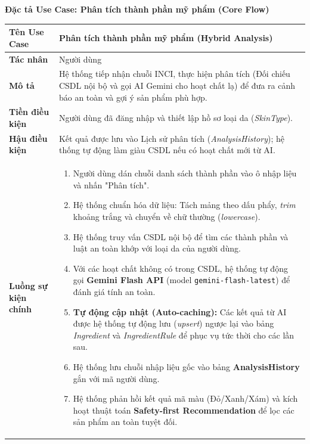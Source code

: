 \documentclass[12pt,a4paper]{article}
\begin{document}

\vspace{0.5cm}
\textbf{Đặc tả Use Case: Phân tích thành phần mỹ phẩm (Core Flow)}

\begin{center}
\renewcommand{\arraystretch}{1.4}
\begin{tabular}{|p{4cm}|p{10cm}|}
\hline
\rowcolor{blue!15}
\textbf{Tên Use Case} & \textbf{Phân tích thành phần mỹ phẩm (Hybrid Analysis)} \\ \hline
\textbf{Tác nhân} & Người dùng \\ \hline
\textbf{Mô tả} & Hệ thống tiếp nhận chuỗi INCI, thực hiện phân tích (Đối chiếu CSDL nội bộ và gọi AI Gemini cho hoạt chất lạ) để đưa ra cảnh báo an toàn và gợi ý sản phẩm phù hợp. \\ \hline
\textbf{Tiền điều kiện} & Người dùng đã đăng nhập và thiết lập hồ sơ loại da (\textit{SkinType}). \\ \hline
\textbf{Hậu điều kiện} & Kết quả được lưu vào Lịch sử phân tích (\textit{AnalysisHistory}); hệ thống tự động làm giàu CSDL nếu có hoạt chất mới từ AI. \\ \hline
\textbf{Luồng sự kiện chính} & 
\begin{enumerate}
    \item Người dùng dán chuỗi danh sách thành phần vào ô nhập liệu và nhấn "Phân tích".
    \item Hệ thống chuẩn hóa dữ liệu: Tách mảng theo dấu phẩy, \textit{trim} khoảng trắng và chuyển về chữ thường (\textit{lowercase}).
    \item Hệ thống truy vấn CSDL nội bộ để tìm các thành phần và luật an toàn khớp với loại da của người dùng.
    \item Với các hoạt chất không có trong CSDL, hệ thống tự động gọi \textbf{Gemini Flash API} (model \texttt{gemini-flash-latest}) để đánh giá tính an toàn.
    \item \textbf{Tự động cập nhật (Auto-caching):} Các kết quả từ AI được hệ thống tự động lưu (\textit{upsert}) ngược lại vào bảng \textit{Ingredient} và \textit{IngredientRule} để phục vụ tức thời cho các lần sau.
    \item Hệ thống lưu chuỗi nhập liệu gốc vào bảng \textbf{AnalysisHistory} gắn với mã người dùng.
    \item Hệ thống phản hồi kết quả mã màu (Đỏ/Xanh/Xám) và kích hoạt thuật toán \textbf{Safety-first Recommendation} để lọc các sản phẩm an toàn tuyệt đối.

\end{enumerate}
\end{tabular}
\end{center}
\end{document}
